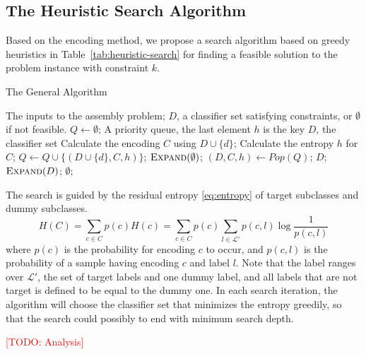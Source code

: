 \documentclass[sigplan,10pt,review]{acmart}\settopmatter{printfolios=true,printccs=false,printacmref=false}
\newcommand{\todo}[1]{\textcolor{red}{[TODO: #1]}}
\begin{document}
\subsection{The Heuristic Search Algorithm}
\label{sec:assembly-algorithm}
Based on the encoding method, we propose a search algorithm based on greedy heuristics in Table~\ref{tab:heuristic-search} for finding a feasible solution to the problem instance with constraint $k$.

\begin{algorithm}
	\caption{The General Algorithm}
	\label{tab:heuristic-search}
	\begin{algorithmic}[1]
		\Require The inputs to the assembly problem;
		\Ensure $D$, a classifier set satisfying constraints, or $\emptyset$ if not feasible.
		\State $Q \gets \emptyset$; \Comment A priority queue, the last element $h$ is the key
		 \Comment $D$, the classifier set
				\State Calculate the encoding $C$ using $D \cup \{d\}$;
				\State Calculate the entropy $h$ for $C$;
				\State $Q \gets Q \cup \{(D \cup \{d\}, C, h)\}$;
			\EndFor
		\EndFunction
			\State $\Call{Expand}{\emptyset}$;
				\State $(D, C, h) \gets Pop(Q)$;
					\State \Return $D$;
				\EndIf
					\State $\Call{Expand}{D}$;
				\EndIf
			\EndWhile
			\State \Return $\emptyset$;
		\EndFunction
	\end{algorithmic}
\end{algorithm}

The search is guided by the residual entropy \eqref{eq:entropy} of target subclasses and dummy subclasses.
\begin{equation}
	H(C) = \sum_{c \in C} p(c)H(c) = \sum_{c \in C} p(c)\sum_{l \in \mathcal{L}'} p(c, l)\log\frac{1}{p(c, l)}
	\label{eq:entropy}
\end{equation}
where $p(c)$ is the probability for encoding $c$ to occur, and $p(c, l)$ is the probability of a sample having encoding $c$ and label $l$.
Note that the label ranges over $\mathcal{L}'$, the set of target labels and one dummy label, and all labels that are not target is defined to be equal to the dummy one.
In each search iteration, the algorithm will choose the classifier set that minimizes the entropy greedily, so that the search could possibly to end with minimum search depth.

\todo{Analysis}
\end{document}
